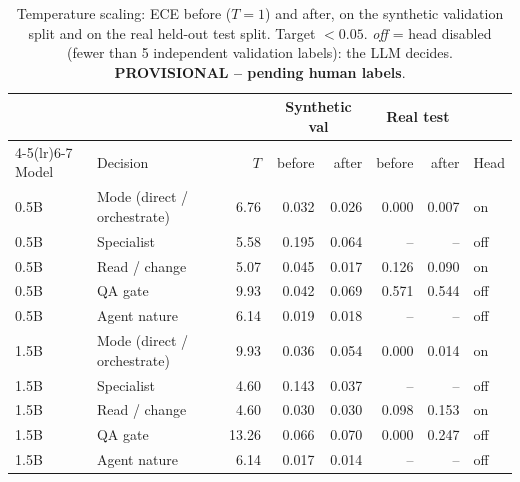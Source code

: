\begin{table}[t]\centering\scriptsize
\caption{Temperature scaling: ECE before ($T{=}1$) and after, on the synthetic validation split and on the real held-out test split. Target $<0.05$. \emph{off} = head disabled (fewer than 5 independent validation labels): the LLM decides. \textbf{PROVISIONAL -- pending human labels}.}
\label{tab:calib}\setlength{\tabcolsep}{2.5pt}
\begin{tabular}{l l r rr rr l}\toprule
 & & & \multicolumn{2}{c}{Synthetic val} & \multicolumn{2}{c}{Real test} & \\
\cmidrule(lr){4-5}\cmidrule(lr){6-7}
Model & Decision & $T$ & before & after & before & after & Head\\\midrule
0.5B & Mode (direct / orchestrate) & 6.76 & 0.032 & 0.026 & 0.000 & 0.007 & on \\
0.5B & Specialist & 5.58 & 0.195 & 0.064 & -- & -- & off \\
0.5B & Read / change & 5.07 & 0.045 & 0.017 & 0.126 & 0.090 & on \\
0.5B & QA gate & 9.93 & 0.042 & 0.069 & 0.571 & 0.544 & off \\
0.5B & Agent nature & 6.14 & 0.019 & 0.018 & -- & -- & off \\
1.5B & Mode (direct / orchestrate) & 9.93 & 0.036 & 0.054 & 0.000 & 0.014 & on \\
1.5B & Specialist & 4.60 & 0.143 & 0.037 & -- & -- & off \\
1.5B & Read / change & 4.60 & 0.030 & 0.030 & 0.098 & 0.153 & on \\
1.5B & QA gate & 13.26 & 0.066 & 0.070 & 0.000 & 0.247 & off \\
1.5B & Agent nature & 6.14 & 0.017 & 0.014 & -- & -- & off \\
\bottomrule\end{tabular}\end{table}
